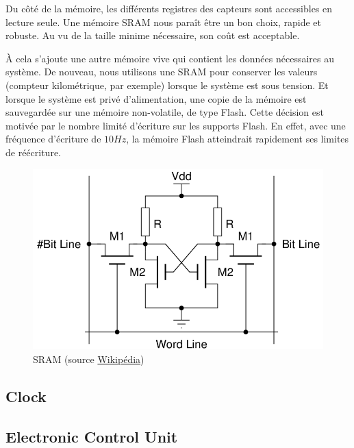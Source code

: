 \documentclass[a4paper,oneside,11pt]{article}  %
\begin{document}
Du côté de la mémoire, les différents registres des capteurs sont accessibles en lecture seule.
Une mémoire SRAM nous paraît être un bon choix, rapide et robuste.
Au vu de la taille minime nécessaire, son coût est acceptable.

À cela s'ajoute une autre mémoire vive qui contient les données nécessaires au système.
De nouveau, nous utilisons une SRAM pour conserver les valeurs (compteur kilométrique, par exemple) lorsque le système est sous tension.
Et lorsque le système est privé d'alimentation, une copie de la mémoire est sauvegardée sur une mémoire non-volatile, de type Flash.
Cette décision est motivée par le nombre limité d'écriture sur les supports Flash.
En effet, avec une fréquence d'écriture de $10 H\!z$, la mémoire Flash atteindrait rapidement ses limites de réécriture.

\begin{figure}[h!]
	\centering
	\includegraphics[scale=0.4]{4T_SRAM_Cell.png}
	\caption{SRAM (source \href{http://en.wikipedia.org/wiki/Static_random-access_memory}{Wikipédia})}
\end{figure}


\subsection{Clock}


\subsection{Electronic Control Unit}
\end{document}
